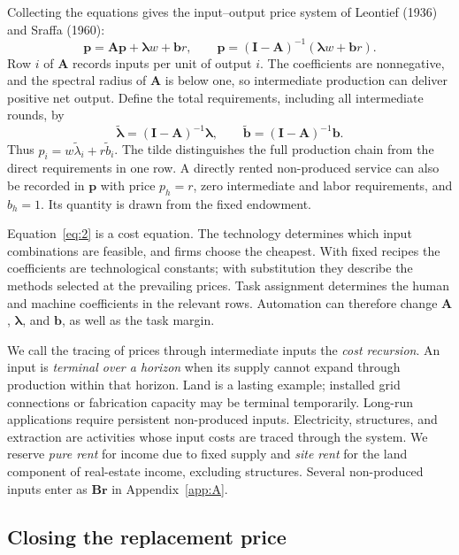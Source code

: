 \documentclass[12pt]{article}
\theoremstyle{plain}
\begin{document}
Collecting the equations gives the input--output price system of Leontief (1936) and Sraffa (1960):
\begin{equation}\label{eq:3}
\mathbf{p} = \mathbf{A}\mathbf{p} + \bm{\lambda}w + \mathbf{b}r,
\qquad
\mathbf{p} = (\mathbf{I}-\mathbf{A})^{-1}(\bm{\lambda}w + \mathbf{b}r).
\end{equation}
Row $i$ of $\mathbf{A}$ records inputs per unit of output $i$. The coefficients are nonnegative, and the spectral radius of $\mathbf{A}$ is below one, so intermediate production can deliver positive net output. Define the total requirements, including all intermediate rounds, by
\begin{equation}\label{eq:4}
\widetilde{\bm{\lambda}} = (\mathbf{I}-\mathbf{A})^{-1}\bm{\lambda},
\qquad
\widetilde{\mathbf{b}} = (\mathbf{I}-\mathbf{A})^{-1}\mathbf{b}.
\end{equation}
Thus $p_i = w\widetilde{\lambda}_i + r\widetilde{b}_i$. The tilde distinguishes the full production chain from the direct requirements in one row. A directly rented non-produced service can also be recorded in $\mathbf{p}$ with price $p_h = r$, zero intermediate and labor requirements, and $b_h = 1$. Its quantity is drawn from the fixed endowment.

Equation~\eqref{eq:2} is a cost equation. The technology determines which input combinations are feasible, and firms choose the cheapest. With fixed recipes the coefficients are technological constants; with substitution they describe the methods selected at the prevailing prices. Task assignment determines the human and machine coefficients in the relevant rows. Automation can therefore change $\mathbf{A}$, $\bm{\lambda}$, and $\mathbf{b}$, as well as the task margin.

We call the tracing of prices through intermediate inputs the \emph{cost recursion}. An input is \emph{terminal over a horizon} when its supply cannot expand through production within that horizon. Land is a lasting example; installed grid connections or fabrication capacity may be terminal temporarily. Long-run applications require persistent non-produced inputs. Electricity, structures, and extraction are activities whose input costs are traced through the system. We reserve \emph{pure rent}
for income due to fixed supply and \emph{site rent} for the land component of
real-estate income, excluding structures. Several non-produced inputs enter as $\mathbf{B}\mathbf{r}$ in Appendix~\ref{app:A}.

\subsection{Closing the replacement price}\label{sec:3.3}
\end{document}
